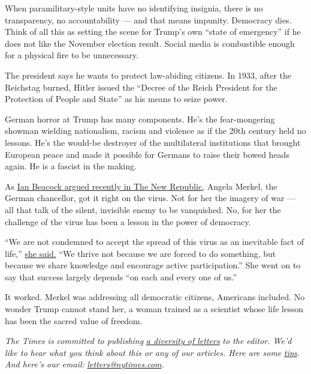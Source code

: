 When paramilitary-style units have no identifying insignia, there is no
transparency, no accountability --- and that means impunity. Democracy
dies. Think of all this as setting the scene for Trump's own ``state of
emergency'' if he does not like the November election result. Social
media is combustible enough for a physical fire to be unnecessary.

The president says he wants to protect law-abiding citizens. In 1933,
after the Reichstag burned, Hitler issued the ``Decree of the Reich
President for the Protection of People and State'' as his means to seize
power.

German horror at Trump has many components. He's the fear-mongering
showman wielding nationalism, racism and violence as if the 20th century
held no lessons. He's the would-be destroyer of the multilateral
institutions that brought European peace and made it possible for
Germans to raise their bowed heads again. He is a fascist in the making.

As
\href{https://www.google.com/url?q=https://newrepublic.com/article/157112/germany-gets-coronavirus\&sa=D\&ust=1595605994586000\&usg=AFQjCNH0rL7W7j6lrXzrAGOt2JzfuSTxVw}{Ian
Beacock argued recently in The New Republic,} Angela Merkel, the German
chancellor, got it right on the virus. Not for her the imagery of war
--- all that talk of the silent, invisible enemy to be vanquished. No,
for her the challenge of the virus has been a lesson in the power of
democracy.

``We are not condemned to accept the spread of this virus as an
inevitable fact of life,''
\href{https://www.bundeskanzlerin.de/bkin-en/news/statement-chancellor-1732302}{she
said.} ``We thrive not because we are forced to do something, but
because we share knowledge and encourage active participation.'' She
went on to say that success largely depends ``on each and every one of
us.''

It worked. Merkel was addressing all democratic citizens, Americans
included. No wonder Trump cannot stand her, a woman trained as a
scientist whose life lesson has been the sacred value of freedom.

\emph{The Times is committed to publishing}
\href{https://www.nytimes.com/2019/01/31/opinion/letters/letters-to-editor-new-york-times-women.html}{\emph{a
diversity of letters}} \emph{to the editor. We'd like to hear what you
think about this or any of our articles. Here are some}
\href{https://help.nytimes.com/hc/en-us/articles/115014925288-How-to-submit-a-letter-to-the-editor}{\emph{tips}}\emph{.
And here's our email:}
\href{mailto:letters@nytimes.com}{\emph{letters@nytimes.com}}\emph{.}

